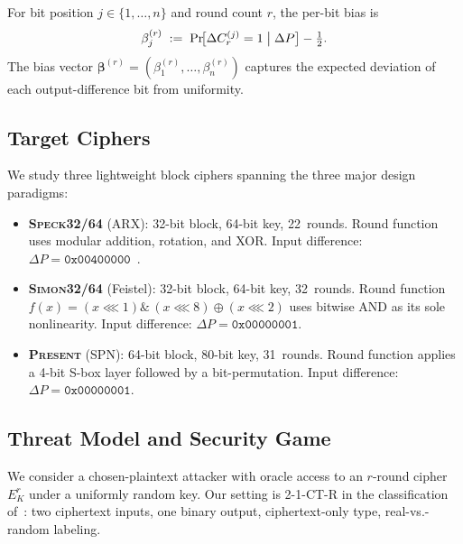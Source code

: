 \documentclass[runningheads]{llncs}
\newcommand{\speck}{\textsc{Speck32/64}}
\newcommand{\simon}{\textsc{Simon32/64}}
\newcommand{\present}{\textsc{Present}}
\begin{document}
\begin{definition}
\label{def:bias}
For bit position $j \in \{1, \ldots, n\}$ and round count $r$, the per-bit bias is
\[
  \beta_j^{(r)}
  \;:=\;
  \Pr\!\bigl[\Delta C_r^{(j)} = 1 \bigm| \Delta P\bigr]
  - \tfrac{1}{2}.
\]
The bias vector $\boldsymbol{\beta}^{(r)} = (\beta_1^{(r)}, \ldots, \beta_n^{(r)})$ captures the expected deviation of each output-difference bit from uniformity.
\end{definition}

\subsection{Target Ciphers}

We study three lightweight block ciphers spanning the three major design paradigms:

\begin{itemize}[itemsep=2pt]
  \item \textbf{\speck} (ARX): 32-bit block, 64-bit key, 22~rounds.
  Round function uses modular addition, rotation, and XOR.
  Input difference: $\Delta P = \texttt{0x00400000}$~\cite{gohr2019}.

  \item \textbf{\simon} (Feistel): 32-bit block, 64-bit key, 32~rounds.
  Round function $f(x) = (x \lll 1) \mathbin{\&}\, (x \lll 8) \oplus (x \lll 2)$ uses bitwise AND as its sole nonlinearity.
  Input difference: $\Delta P = \texttt{0x00000001}$.

  \item \textbf{\present} (SPN): 64-bit block, 80-bit key, 31~rounds.
  Round function applies a 4-bit S-box layer followed by a bit-permutation.
  Input difference: $\Delta P = \texttt{0x00000001}$.
\end{itemize}

\subsection{Threat Model and Security Game}
\label{sec:security-game}

We consider a chosen-plaintext attacker with oracle access to an $r$-round cipher $E^r_K$ under a uniformly random key.
Our setting is 2-1-CT-R in the classification of~\cite{bellini2023dbitnet,gerault2024sok}: two ciphertext inputs, one binary output, ciphertext-only type, real-vs.-random labeling.
\end{document}
